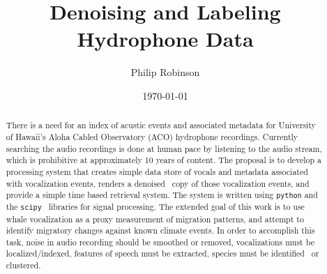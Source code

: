 \documentclass{article}
\title{Denoising and Labeling Hydrophone Data}
\date{\today}
\author{Philip Robinson}
\affil{Oregon Health Sciences University}
\begin{document}
\maketitle


\begin{abstract}
  There is a need for an index of acustic events and associated metadata for University of Hawaii's Aloha Cabled Observatory (ACO) hydrophone recordings. Currently searching the audio recordings is done at human pace by listening to the audio stream, which is prohibitive at approximately 10 years of content.
The proposal is to develop a processing system that creates simple data store of vocals and metadata associated with vocalization events, renders a denoised~\cite{Baskar2015StudyOD,specsub2008,Berouti1979EnhancementOS} copy of those vocalization events, and provide a simple time based retrieval system. The system is written using \texttt{python} and the \texttt{scipy}~\cite{Jones2001} libraries for signal processing. %
 The extended goal of this work is to use whale vocalization as a proxy measurement of migration patterns, and attempt to identify migratory changes against known climate events. In order to accomplish this task, noise in audio recording should be smoothed or removed, vocalizations must be localized/indexed, features of speech must be extracted, species must be identified~\cite{2014ASAJ} or clustered.
\end{abstract}
\end{document}
